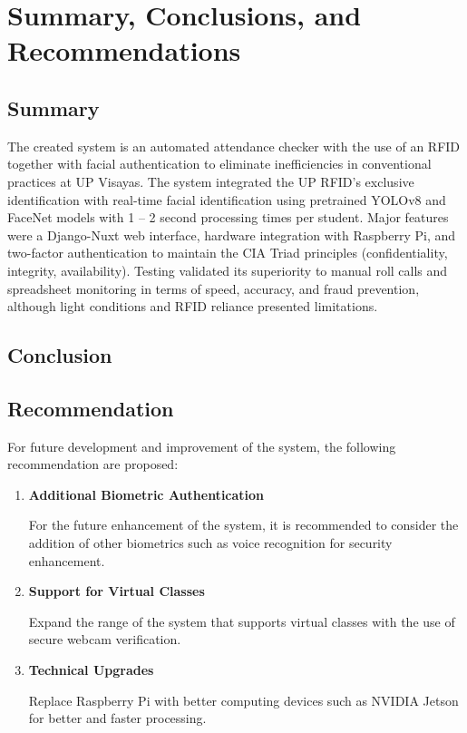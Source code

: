 \chapter{Summary, Conclusions, and Recommendations}

\section{Summary}

	The created system is an automated attendance checker with the use of an RFID together with facial authentication to eliminate inefficiencies in conventional practices at UP Visayas. The system integrated the UP RFID's exclusive identification with real-time facial identification using pretrained YOLOv8 and FaceNet models with 1 – 2 second processing times per student. Major features were a Django-Nuxt web interface, hardware integration with Raspberry Pi, and two-factor authentication to maintain the CIA Triad principles (confidentiality, integrity, availability). Testing validated its superiority to manual roll calls and spreadsheet monitoring in terms of speed, accuracy, and fraud prevention, although light conditions and RFID reliance presented limitations.

\section{Conclusion}

\section{Recommendation}
	For future development and improvement of the system, the following recommendation are proposed:
	
	\begin{enumerate}
		\item \textbf{Additional Biometric Authentication}
	
		For the future enhancement of the system, it is recommended to consider the addition of other biometrics such as voice recognition for security enhancement.
		
		\item \textbf{Support for Virtual Classes}
		
		Expand the range of the system that supports virtual classes with the use of secure webcam verification.
		
		\item \textbf{Technical Upgrades}
		
		Replace Raspberry Pi with better computing devices such as NVIDIA Jetson for better and faster processing.
		
	\end{enumerate}
	
